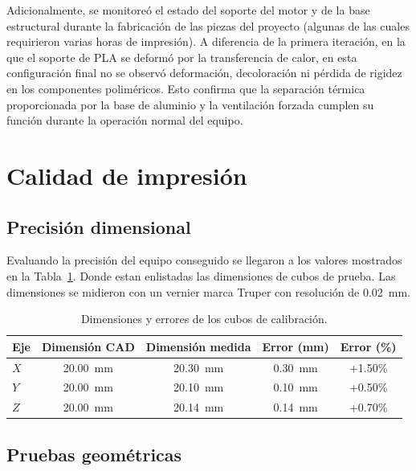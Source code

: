 Adicionalmente, se monitoreó el estado del soporte del motor y de la base 
estructural durante la fabricación de las piezas del proyecto (algunas de las 
cuales requirieron varias horas de impresión). A diferencia de la primera 
iteración, en la que el soporte de PLA se deformó por la transferencia de 
calor, en esta configuración final no se observó deformación, decoloración ni 
pérdida de rigidez en los componentes poliméricos. Esto confirma que la 
separación térmica proporcionada por la base de aluminio y la ventilación 
forzada cumplen su función durante la operación normal del equipo.


\section{Calidad de impresión}

\subsection{Precisión dimensional}

Evaluando la precisión del equipo conseguido se llegaron a los valores mostrados en la Tabla~\ref{tab:cubos_calibracion}. Donde estan enlistadas las dimensiones de cubos de prueba. Las dimensiones se midieron con un vernier marca Truper con resolución de \qty{0.02}{\mm}. 

\begin{table}[htbp]
    \centering
    \caption{Dimensiones y errores de los cubos de calibración.}
    \label{tab:cubos_calibracion}
    \begin{tabular}{lcccc}
        \toprule
        \textbf{Eje} & \textbf{Dimensión CAD} & \textbf{Dimensión medida} & \textbf{Error (mm)} & \textbf{Error (\%)} \\
        \midrule
        \(X\) & \qty{20.00}{\mm} & \qty{20.30}{\mm} & \qty{+0.30}{\mm} & +1.50\% \\
        \(Y\) & \qty{20.00}{\mm} & \qty{20.10}{\mm} & \qty{+0.10}{\mm} & +0.50\% \\
        \(Z\) & \qty{20.00}{\mm} & \qty{20.14}{\mm} & \qty{+0.14}{\mm} & +0.70\% \\
        \bottomrule
    \end{tabular}
\end{table}


\subsection{Pruebas geométricas}
\label{subsec:pruebas_geometricas}

